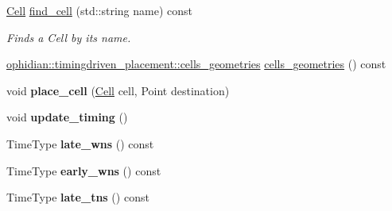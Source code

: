 \begin{DoxyCompactItemize}
\item 
\hyperlink{classophidian_1_1entity_1_1entity}{Cell} \hyperlink{classophidian_1_1timingdriven__placement_1_1timingdriven__placement_a12c8ff49633161d22b04b6b19f542192}{find\-\_\-cell} (std\-::string name) const 
\begin{DoxyCompactList}\small\item\em Finds a Cell by its name. \end{DoxyCompactList}\item 
\hyperlink{structophidian_1_1timingdriven__placement_1_1cells__geometries}{ophidian\-::timingdriven\-\_\-placement\-::cells\-\_\-geometries} \hyperlink{classophidian_1_1timingdriven__placement_1_1timingdriven__placement_a47981e241c75e4dda4ed959d2913851e}{cells\-\_\-geometries} () const 
\item 
\hypertarget{classophidian_1_1timingdriven__placement_1_1timingdriven__placement_a169ccee6e83cb7f2debb7a938463faab}{void {\bfseries place\-\_\-cell} (\hyperlink{classophidian_1_1entity_1_1entity}{Cell} cell, Point destination)}\label{classophidian_1_1timingdriven__placement_1_1timingdriven__placement_a169ccee6e83cb7f2debb7a938463faab}

\item 
\hypertarget{classophidian_1_1timingdriven__placement_1_1timingdriven__placement_ae0e7ff8965e80fb1a8f2da03fe7b8a53}{void {\bfseries update\-\_\-timing} ()}\label{classophidian_1_1timingdriven__placement_1_1timingdriven__placement_ae0e7ff8965e80fb1a8f2da03fe7b8a53}

\item 
\hypertarget{classophidian_1_1timingdriven__placement_1_1timingdriven__placement_a7d8bc0e41656fbc4b6c620eb378f7b2c}{Time\-Type {\bfseries late\-\_\-wns} () const }\label{classophidian_1_1timingdriven__placement_1_1timingdriven__placement_a7d8bc0e41656fbc4b6c620eb378f7b2c}

\item 
\hypertarget{classophidian_1_1timingdriven__placement_1_1timingdriven__placement_abae2060ded2cba7fde840611af43a0d1}{Time\-Type {\bfseries early\-\_\-wns} () const }\label{classophidian_1_1timingdriven__placement_1_1timingdriven__placement_abae2060ded2cba7fde840611af43a0d1}

\item 
\hypertarget{classophidian_1_1timingdriven__placement_1_1timingdriven__placement_a3a4cd8150fba9c8e353ffdc02ee01c72}{Time\-Type {\bfseries late\-\_\-tns} () const }\label{classophidian_1_1timingdriven__placement_1_1timingdriven__placement_a3a4cd8150fba9c8e353ffdc02ee01c72}


\end{DoxyCompactItemize}
